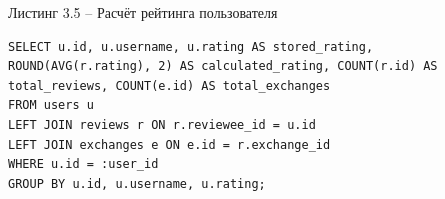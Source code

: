 \documentclass[14pt,a4paper]{extarticle}
\begin{document}
\newpage
\begin{center}
Листинг 3.5 -- Расчёт рейтинга пользователя
\end{center}
\begin{lstlisting}
SELECT u.id, u.username, u.rating AS stored_rating, ROUND(AVG(r.rating), 2) AS calculated_rating, COUNT(r.id) AS total_reviews, COUNT(e.id) AS total_exchanges
FROM users u
LEFT JOIN reviews r ON r.reviewee_id = u.id
LEFT JOIN exchanges e ON e.id = r.exchange_id
WHERE u.id = :user_id
GROUP BY u.id, u.username, u.rating;
\end{lstlisting}
\end{document}
